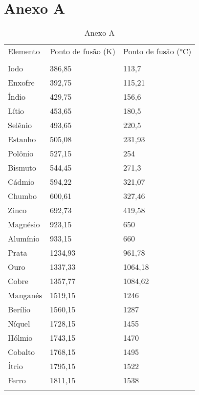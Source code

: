 \documentclass[a4paper,12pt]{article}%
\begin{document}
\section{Anexo A}
\begin{table}[]
	\centering
	\caption{Anexo A}
	\label{my-label}
	\begin{tabular}{lll}
		Elemento & Ponto de fusão (K) & Ponto de fusão (°C) \\
		&                    &                     \\
		Iodo     & 386,85             & 113,7               \\
		Enxofre  & 392,75             & 115,21              \\
		Índio    & 429,75             & 156,6               \\
		Lítio    & 453,65             & 180,5               \\
		Selênio  & 493,65             & 220,5               \\
		Estanho  & 505,08             & 231,93              \\
		Polônio  & 527,15             & 254                 \\
		Bismuto  & 544,45             & 271,3               \\
		Cádmio   & 594,22             & 321,07              \\
		Chumbo   & 600,61             & 327,46              \\
		Zinco    & 692,73             & 419,58              \\
		Magnésio & 923,15             & 650                 \\
		Alumínio & 933,15             & 660                 \\
		Prata    & 1234,93            & 961,78              \\
		Ouro     & 1337,33            & 1064,18             \\
		Cobre    & 1357,77            & 1084,62             \\
		Manganés & 1519,15            & 1246                \\
		Berílio  & 1560,15            & 1287                \\
		Níquel   & 1728,15            & 1455                \\
		Hólmio   & 1743,15            & 1470                \\
		Cobalto  & 1768,15            & 1495                \\
		Ítrio    & 1795,15            & 1522                \\
		Ferro    & 1811,15            & 1538                \\
		&                    &                    
	\end{tabular}
\end{table}
\end{document}
